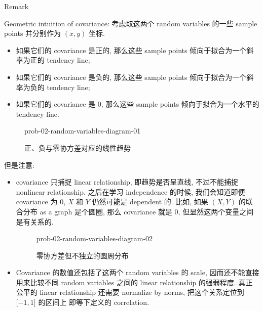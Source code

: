 \begin{qlremark}{Remark}

Geometric intuition of covariance: 考虑取这两个 random variables 的一些 sample points 并分别作为 \((\mathit{x},\mathit{y})\) 坐标.

\begin{itemize}
\item
  如果它们的 covariance 是正的, 那么这些 sample points 倾向于拟合为一个斜率为正的 tendency line;
\item
  如果它们的 covariance 是负的, 那么这些 sample points 倾向于拟合为一个斜率为负的 tendency line;
\item
  如果它们的 covariance 是 0, 那么这些 sample points 倾向于拟合为一个水平的 tendency line.
\end{itemize}

\begin{figure}[htbp]
\centering
\begin{qldrawing}
\csname prob-02-random-variables-diagram-01\endcsname
\end{qldrawing}

\caption{正、负与零协方差对应的线性趋势}

\label{fig-prob-02-random-variables-diagram-01}

\end{figure}

但是注意:

\begin{itemize}
\item
  covariance 只捕捉 linear relationship, 即趋势是否呈直线, 不过不能捕捉 nonlinear relationship. 之后在学习 independence 的时候, 我们会知道即便 covariance 为 0, \(\mathit{X}\) 和 \(\mathit{Y}\) 仍然可能是 dependent 的. 比如, 如果 \((\mathit{X},\mathit{Y})\) 的联合分布 as a graph 是个圆圈, 那么 covariance 就是 0, 但显然这两个变量之间是有关系的.

  \begin{figure}[htbp]
  \centering
  \begin{qldrawing}
  \csname prob-02-random-variables-diagram-02\endcsname
  \end{qldrawing}

  \caption{零协方差但不独立的圆周分布}

  \label{fig-prob-02-random-variables-diagram-02}

  \end{figure}
\item
  Covariance 的数值还包括了这两个 random variables 的 scale, 因而还不能直接用来比较不同 random variables 之间的 linear relationship 的强弱程度. 真正公平的 linear relationship 还需要 normalize by norms, 把这个关系定位到 \(\lbrack - 1,1\rbrack\) 的区间上 即等下定义的 correlation.
\end{itemize}

\end{qlremark}

